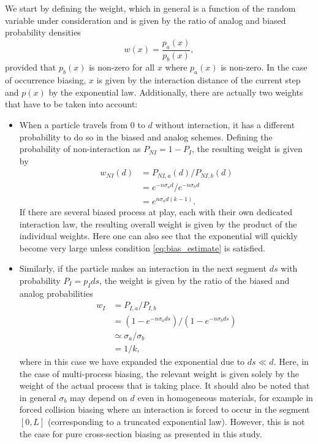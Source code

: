 We start by defining the weight, which in general is a function of the random variable under consideration and is given by the ratio of analog and biased probability densities
%
\begin{equation} \label{eq:weight}
w(x) = \frac{p_a(x)}{p_b(x)},
\end{equation}
%
provided that $p_b(x)$ is non-zero for all $x$ where $p_a(x)$ is non-zero. In the case of occurrence biasing, $x$ is given by the interaction distance of the current step and $p(x)$ by the exponential law. Additionally, there are actually two weights that have to be taken into account:
%
\begin{itemize}
    \item When a particle travels from 0 to $d$ without interaction, it has a different probability to do so in the biased and analog schemes. Defining the probability of non-interaction as $P_{NI} = 1 - P_{I}$, the resulting weight is given by
    \begin{equation} \label{eq:weight_NI}
    \begin{split}
    w_{NI}(d) &= P_{NI,a}(d)/P_{NI,b}(d)\\
    &=e^{-n\sigma_a d}/e^{-n\sigma_b d}\\
    &= e^{n\sigma_a d(k-1)}.
    \end{split}
    \end{equation}
    If there are several biased process at play, each with their own dedicated interaction law, the resulting overall weight is given by the product of the individual weights. Here one can also see that the exponential will quickly become very large unless condition \ref{eq:bias_estimate} is satisfied.
    \item Similarly, if the particle makes an interaction in the next segment $ds$ with probability $P_I = p_I ds$, the weight is given by the ratio of the biased and analog probabilities
    \begin{equation} \label{eq:weight_I}
    \begin{split}
    w_{I} &= P_{I,a}/P_{I,b}\\
    &=(1-e^{-n\sigma_a ds})/(1-e^{-n\sigma_b ds})\\
    &\simeq \sigma_a / \sigma_b\\
    &= 1/k,
    \end{split}
    \end{equation}
    where in this case we have expanded the exponential due to $ds \ll d$. Here, in the case of multi-process biasing, the relevant weight is given solely by the weight of the actual process that is taking place. It should also be noted that in general $\sigma_b$ may depend on $d$ even in homogeneous materials, for example in forced collision biasing where an interaction is forced to occur in the segment $[0,L]$ (corresponding to a truncated exponential law). However, this is not the case for pure cross-section biasing as presented in this study.
\end{itemize}
